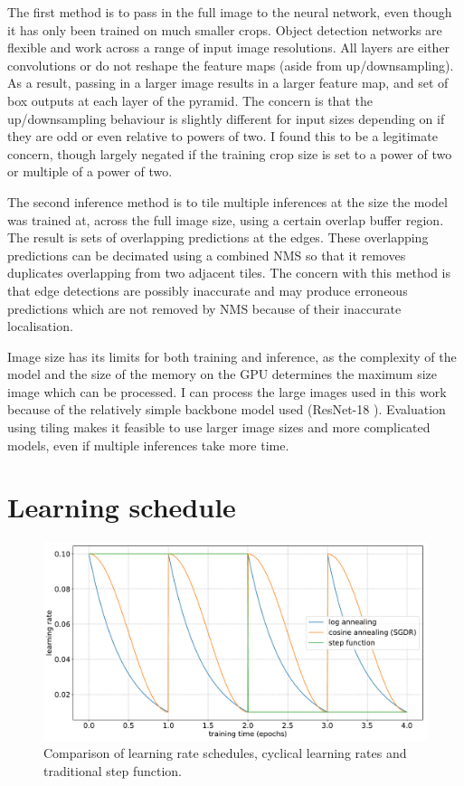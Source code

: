 The first method is to pass in the full image to the neural network, even though it has only been trained on much smaller crops. Object detection networks are flexible and work across a range of input image resolutions. All layers are either convolutions or do not reshape the feature maps (aside from up/downsampling). As a result, passing in a larger image results in a larger feature map, and set of box outputs at each layer of the pyramid. The concern is that the up/downsampling behaviour is slightly different for input sizes depending on if they are odd or even relative to powers of two. I found this to be a legitimate concern, though largely negated if the training crop size is set to a power of two or multiple of a power of two. 

The second inference method is to tile multiple inferences at the size the model was trained at, across the full image size, using a certain overlap buffer region. The result is sets of overlapping predictions at the edges. These overlapping predictions can be decimated using a combined \gls{NMS} so that it removes duplicates overlapping from two adjacent tiles. The concern with this method is that edge detections are possibly inaccurate and may produce erroneous predictions which are not removed by \gls{NMS} because of their inaccurate localisation. 

Image size has its limits for both training and inference, as the complexity of the model and the size of the memory on the \gls{GPU} determines the maximum size image which can be processed. I can process the large images used in this work because of the relatively simple backbone model used (ResNet-18 \cite{He}). Evaluation using tiling makes it feasible to use larger image sizes and more complicated models, even if multiple inferences take more time.


\section {Learning schedule}
\label{sec:schedule}

\begin{figure}[h]
  \centering
  \includegraphics[width=1.0\linewidth]{charts/training/lr_schedules.pdf}
  \caption{Comparison of learning rate schedules, cyclical learning rates and traditional step function.  }  
  \label{fig:lr_schedule}
\end{figure}


